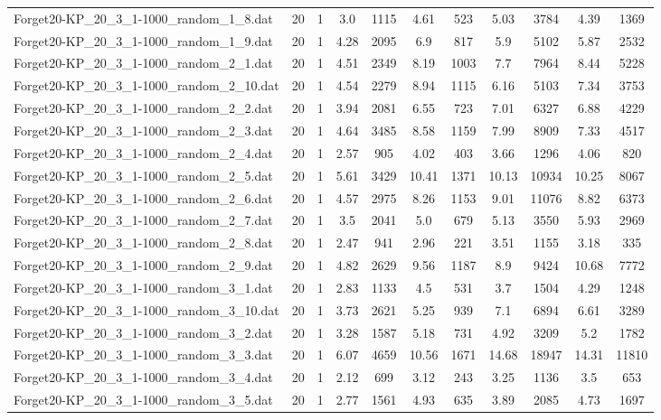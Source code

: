 \begin{table}[!ht]
\begin{tabular}{lcccccccccc}
Forget20-KP\_20\_3\_1-1000\_random\_1\_8.dat & 20 & 1 & 3.0 & 1115 & 4.61 & 523 & 5.03 & 3784 & 4.39 & 1369 \\
Forget20-KP\_20\_3\_1-1000\_random\_1\_9.dat & 20 & 1 & 4.28 & 2095 & 6.9 & 817 & 5.9 & 5102 & 5.87 & 2532 \\
Forget20-KP\_20\_3\_1-1000\_random\_2\_1.dat & 20 & 1 & 4.51 & 2349 & 8.19 & 1003 & 7.7 & 7964 & 8.44 & 5228 \\
Forget20-KP\_20\_3\_1-1000\_random\_2\_10.dat & 20 & 1 & 4.54 & 2279 & 8.94 & 1115 & 6.16 & 5103 & 7.34 & 3753 \\
Forget20-KP\_20\_3\_1-1000\_random\_2\_2.dat & 20 & 1 & 3.94 & 2081 & 6.55 & 723 & 7.01 & 6327 & 6.88 & 4229 \\
Forget20-KP\_20\_3\_1-1000\_random\_2\_3.dat & 20 & 1 & 4.64 & 3485 & 8.58 & 1159 & 7.99 & 8909 & 7.33 & 4517 \\
Forget20-KP\_20\_3\_1-1000\_random\_2\_4.dat & 20 & 1 & 2.57 & 905 & 4.02 & 403 & 3.66 & 1296 & 4.06 & 820 \\
Forget20-KP\_20\_3\_1-1000\_random\_2\_5.dat & 20 & 1 & 5.61 & 3429 & 10.41 & 1371 & 10.13 & 10934 & 10.25 & 8067 \\
Forget20-KP\_20\_3\_1-1000\_random\_2\_6.dat & 20 & 1 & 4.57 & 2975 & 8.26 & 1153 & 9.01 & 11076 & 8.82 & 6373 \\
Forget20-KP\_20\_3\_1-1000\_random\_2\_7.dat & 20 & 1 & 3.5 & 2041 & 5.0 & 679 & 5.13 & 3550 & 5.93 & 2969 \\
Forget20-KP\_20\_3\_1-1000\_random\_2\_8.dat & 20 & 1 & 2.47 & 941 & 2.96 & 221 & 3.51 & 1155 & 3.18 & 335 \\
Forget20-KP\_20\_3\_1-1000\_random\_2\_9.dat & 20 & 1 & 4.82 & 2629 & 9.56 & 1187 & 8.9 & 9424 & 10.68 & 7772 \\
Forget20-KP\_20\_3\_1-1000\_random\_3\_1.dat & 20 & 1 & 2.83 & 1133 & 4.5 & 531 & 3.7 & 1504 & 4.29 & 1248 \\
Forget20-KP\_20\_3\_1-1000\_random\_3\_10.dat & 20 & 1 & 3.73 & 2621 & 5.25 & 939 & 7.1 & 6894 & 6.61 & 3289 \\
Forget20-KP\_20\_3\_1-1000\_random\_3\_2.dat & 20 & 1 & 3.28 & 1587 & 5.18 & 731 & 4.92 & 3209 & 5.2 & 1782 \\
Forget20-KP\_20\_3\_1-1000\_random\_3\_3.dat & 20 & 1 & 6.07 & 4659 & 10.56 & 1671 & 14.68 & 18947 & 14.31 & 11810 \\
Forget20-KP\_20\_3\_1-1000\_random\_3\_4.dat & 20 & 1 & 2.12 & 699 & 3.12 & 243 & 3.25 & 1136 & 3.5 & 653 \\
Forget20-KP\_20\_3\_1-1000\_random\_3\_5.dat & 20 & 1 & 2.77 & 1561 & 4.93 & 635 & 3.89 & 2085 & 4.73 & 1697 \\

\end{tabular}
\end{table}
